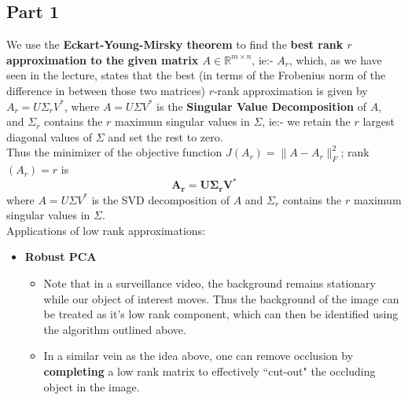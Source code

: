 \documentclass[a4paper,14pt]{article}
\numberwithin{definition}{section}
\numberwithin{mytheorem}{subsection}
\begin{document}
\subsection{Part 1}
We use the \textbf{Eckart-Young-Mirsky theorem} to find the \textbf{best rank $r$ approximation to the given matrix $A\in\mathbb{R}^{m\times n}$}, ie:- $A_r$, which, as we have seen in the lecture, states that the best (in terms of the Frobenius norm of the difference in between those two matrices) $r$-rank approximation is given by $A_r = U\Sigma_rV^*$, where $A = U\Sigma V^*$ is the \textbf{Singular Value Decomposition} of $A$, and $\Sigma_r$ contains the $r$ maximum singular values in $\Sigma$, ie:- we retain the $r$ largest diagonal values of $\Sigma$ and set the rest to zero.\\
Thus the minimizer of the objective function $J(A_r) = \lVert A - A_r\rVert^2_F$; rank$(A_r) = r$ is 
$$\boldsymbol{A_r = U\Sigma_rV^*}$$
where $A = U\Sigma V^*$ is the SVD decomposition of $A$ and $\Sigma_r$ contains the $r$ maximum singular values in $\Sigma$.\\
Applications of low rank approximations:
\begin{itemize}
    \item \textbf{Robust PCA}
    \begin{itemize}
        \item Note that in a surveillance video, the background remains stationary while our object of interest moves. Thus the background of the image can be treated as it's low rank component, which can then be identified using the algorithm outlined above.
        \item In a similar vein as the idea above, one can remove occlusion by \textbf{completing} a low rank matrix to effectively ``cut-out" the occluding object in the image.
    \end{itemize} 
\end{itemize}
\end{document}
